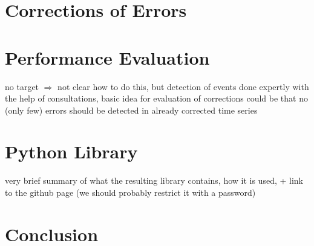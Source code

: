 \documentclass[12pt,a4paper]{article}
\begin{document}
\section{Corrections of Errors}


\section{Performance Evaluation}
no target $\Rightarrow$ not clear how to do this, but detection of events done expertly with the help of consultations,  basic idea for evaluation of corrections could be that no (only few) errors should be detected in already corrected time series 


\section{Python Library}

very brief summary of what the resulting library contains, how it is used, + link to the github page (we should probably restrict it with a password)






\section{Conclusion}
\end{document}
